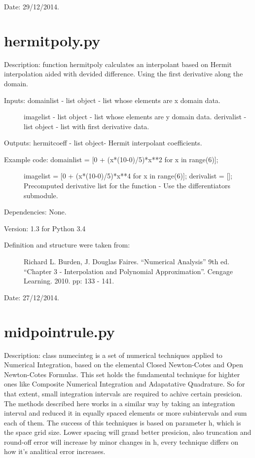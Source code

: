 \documentclass[letterpaper,10pt,oneside]{sphinxmanual}
\theoremstyle{plain}%
\theoremstyle{definition}%
\theoremstyle{remark}%
\begin{document}
Date: 29/12/2014.


\section{hermitpoly.py}
\label{code:hermitpoly-py}\label{code:module-hermitpoly}
Description: function hermitpoly calculates an interpolant based on Hermit
interpolation aided with devided difference. Using the first derivative 
along the domain.
\begin{description}
\item[{Inputs: domainlist - list object - list whose elements are x domain data.}] \leavevmode
imagelist - list object - list whose elements are y domain data.
derivalist - list object - list with first derivative data.

\end{description}

Outputs: hermitcoeff - list object- Hermit interpolant coefficients.
\begin{description}
\item[{Example code: domainlist = {[}0 + (x*(10-0)/5)*x**2 for x in range(6){]};}] \leavevmode
imagelist = {[}0 + (x*(10-0)/5)*x**4 for x in range(6){]};
derivalist = {[}{]}; Precomputed derivative list for the function - Use the differentiators submodule.

\end{description}

Dependencies: None.

Version: 1.3 for Python 3.4
\begin{description}
\item[{Definition and structure were taken from:}] \leavevmode
Richard L. Burden, J. Douglas Faires. ``Numerical Analysis'' 9th ed.
``Chapter 3 - Interpolation and Polynomial Approximation''. 
Cengage Learning. 2010. pp: 133 - 141.

\end{description}




Date: 27/12/2014.


\section{midpointrule.py}
\label{code:module-midpointrule}\label{code:midpointrule-py}
Description: class numecinteg is a set of numerical techniques applied to
Numerical Integration, based on the elemental Closed Newton-Cotes and
Open Newton-Cotes Formulas. This set holds the fundamental technique for
highter ones like Composite Numerical Integration and Adapatative Quadrature.
So for that extent, small integration intervals are required to achive certain
presicion. The methods described here works in a similar way by taking an
integration interval and reduced it in equally spaced elements or more 
subintervals and sum each of them. The success of this techniques is based
on parameter h, which is the space grid size. Lower spacing will grand better
presicion, also truncation and round-off error will increase by minor changes
in h, every technique differs on how it's analitical error increases.
\end{document}
